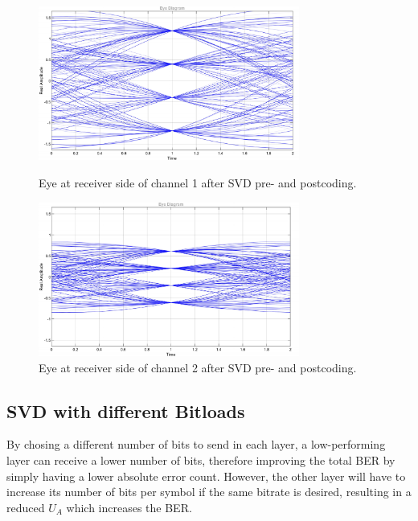 \documentclass[10pt, a4paper]{article}
\begin{document}
\begin{figure}[h]
    \centering
    \begin{minipage}{0.45\textwidth}
        \centering
        \includegraphics[width=0.764\textwidth]{graphics/mimo_eye_svd_raw_ch_1.pdf}
        \caption{Eye at receiver side of channel 1 after SVD pre- and postcoding.}\label{fig:svd_plain1}
    \end{minipage}\hfill
    \begin{minipage}{0.45\textwidth}
        \centering
        \includegraphics[width=0.764\textwidth]{graphics/mimo_eye_svd_raw_ch_2.pdf}
        \caption{Eye at receiver side of channel 2 after SVD pre- and postcoding.}\label{fig:svd_plain2}
    \end{minipage}
\end{figure}

\subsection{SVD with different Bitloads}
By chosing a different number of bits to send in each layer, a low-performing layer can receive a lower number of bits, therefore improving the total BER by simply having a lower absolute error count. However, the other layer will have to increase its number of bits per symbol if the same bitrate is desired, resulting in a reduced $U_{A}$ which increases the BER.\\
\end{document}
